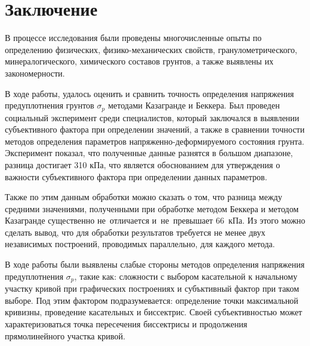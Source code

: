 \chapter*{Заключение}                       %


В процессе исследования были проведены многочисленные опыты по определению физических, физико-механических свойств, гранулометрического, минералогического, химического составов грунтов, а также выявлены их закономерности. 

В ходе работы, удалось оценить и сравнить точность определения напряжения предуплотнения грунтов $\sigma_p$ методами Казагранде и Беккера. Был проведен социальный эксперимент среди специалистов, который заключался в выявлении субъективного фактора при определении значений, а также в сравнении точности методов определения параметров напряженно-деформируемого состояния грунта. Эксперимент показал, что полученные данные разнятся в большом диапазоне, разница достигает 310 кПа, что является обоснованием для утверждения о важности субъективного фактора при определении данных параметров.

Также по этим данным обработки можно сказать о том, что разница между средними значениями, полученными при обработке методом Беккера и методом Казагранде существенно не~отличается и~не~превышает 66~кПа. Из этого можно сделать вывод, что для обработки результатов требуется не менее двух независимых построений, проводимых параллельно, для каждого метода.

В ходе работы были выявлены слабые стороны методов определения напряжения предуплотнения $\sigma_p$, такие как: сложности с выбором касательной к начальному участку кривой при графических построениях и субъктивный фактор при таком выборе. Под этим фактором подразумевается: определение точки максимальной кривизны, проведение касательных и биссектрис. Своей субъективностью может характеризоваться точка пересечения биссектрисы и продолжения прямолинейного участка кривой.


